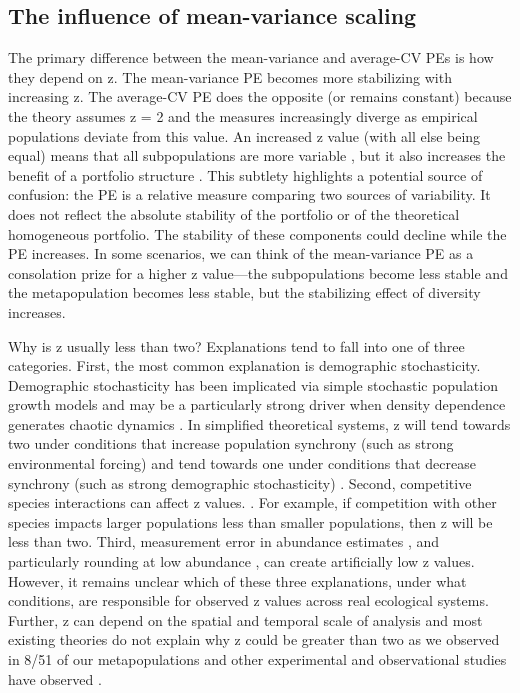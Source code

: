 \subsection{The influence of mean-variance scaling}

The primary difference between the mean-variance and average-CV PEs is how they
depend on z. The mean-variance PE becomes more stabilizing with increasing z.
The average-CV PE does the opposite (or remains constant) because the theory
assumes z = 2 and the measures increasingly diverge as empirical populations
deviate from this value. An increased z value (with all else being equal) means
that all subpopulations are more variable \citep{mellin2010}, but it also
increases the benefit of a portfolio structure \citep{tilman1998,
tilman1999, cottingham2001}. This subtlety highlights a potential
source of confusion: the PE is a relative measure comparing two sources of
variability. It does not reflect the absolute stability of the portfolio or of
the theoretical homogeneous portfolio. The stability of these components could
decline while the PE increases. In some scenarios, we can think of the
mean-variance PE as a consolation prize for a higher z value---the
subpopulations become less stable and the metapopulation becomes less stable,
but the stabilizing effect of diversity increases.

Why is z usually less than two?
Explanations tend to fall into one of three categories. First, the most common
explanation is demographic stochasticity. Demographic stochasticity has been
implicated via simple stochastic population growth models
\citep[e.g.][]{anderson1982, ballantyne2005} and may be a
particularly strong driver when density dependence generates chaotic dynamics
\citep{perry1994}. In simplified theoretical systems, z will tend towards
two under conditions that increase population synchrony (such as strong
environmental forcing) and tend towards one under conditions that decrease
synchrony (such as strong demographic stochasticity) \citep{loreau2010a}.
Second, competitive species interactions can affect z values.
\citep{kilpatrick2003}. For example, if competition with other species
impacts larger populations less than smaller populations, then z
will be less than two. Third, measurement error in abundance estimates
\citep{perry1981}, and particularly rounding at low abundance
\citep{taylor1982}, can create artificially low z values. However, it
remains unclear which of these three explanations, under what conditions, are
responsible for observed z values across real ecological systems. Further, z can
depend on the spatial and temporal scale of analysis \citep{leps1993} and
most existing theories do not explain why z could be greater than two as
we observed in 8/51 of our metapopulations and other experimental and
observational studies have observed \citep[e.g.][]{valone2003}.

